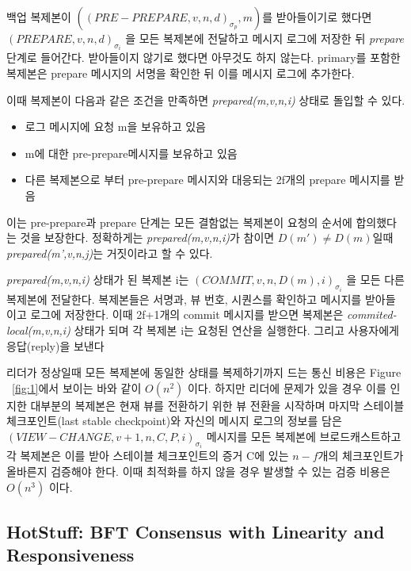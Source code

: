 백업 복제본이 \(((PRE-PREPARE,v,n,d)_{\sigma_{p}},m)\)를 받아들이기로 했다면 \((PREPARE,v,n,d)_{\sigma_{i}}\)
을 모든 복제본에 전달하고 메시지 로그에 저장한 뒤 \textit{prepare} 단계로 들어간다. 받아들이지 않기로 했다면
 아무것도 하지 않는다. primary를 포함한 복제본은 prepare 메시지의 서명을 확인한 뒤 이를 메시지 로그에 추가한다.

이때 복제본이 다음과 같은 조건을 만족하면 \textit{prepared(m,v,n,i)} 상태로 돌입할 수 있다. 
\begin{itemize}
\item 로그 메시지에 요청 m을 보유하고 있음
\item m에 대한 pre-prepare메시지를 보유하고 있음
\item 다른 복제본으로 부터 pre-prepare 메시지와 대응되는 2f개의 prepare 메시지를 받음
\end{itemize}
이는 pre-prepare과 prepare 단계는 모든 결함없는 복제본이 요청의 순서에 합의했다는 것을 보장한다. 
정확하게는 \textit{prepared(m,v,n,i)}가 참이면 \(D(m') \neq D(m)\)일때 
\textit{prepared(m',v,n,j)}는 거짓이라고 할 수 있다. 

\textit{prepared(m,v,n,i)} 상태가 된 복제본 i는 \((COMMIT,v,n,D(m),i)_{\sigma_{i}}\) 을
모든 다른 복제본에 전달한다. 복제본들은 서명과, 뷰 번호, 시퀀스를 확인하고 메시지를 받아들이고
로그에 저장한다. 이때 2f+1개의 commit 메시지를 받으면 복제본은 \textit{commited-local(m,v,n,i)} 상태가 되며
각 복제본 i는 요청된 연산을 실행한다. 그리고 사용자에게 응답(reply)을 보낸다

리더가 정상일때 모든 복제본에 동일한 상태를 복제하기까지 드는 통신
비용은 Figure ~\ref{fig:1}에서 보이는 바와 같이 \(O(n^{2})\) 이다.
하지만 리더에 문제가 있을 경우 이를 인지한 대부분의 복제본은 현재 뷰를 전환하기 위한 뷰 전환을 시작하며
마지막 스테이블 체크포인트(last stable checkpoint)와 자신의 메시지 로그의 정보를 담은 
\((VIEW-CHANGE,v+1,n,C,P,i)_{\sigma_{i}}\) 메시지를 모든 복제본에 브로드캐스트하고 
각 복제본은 이를 받아 스테이블 체크포인트의 증거 C에 있는 \(n-f\)개의 체크포인트가 올바른지 검증해야 한다.
이때 최적화를 하지 않을 경우 발생할 수 있는 검증 비용은 \(O(n^{3})\) 이다.

\subsection{HotStuff: BFT Consensus with Linearity and Responsiveness}

